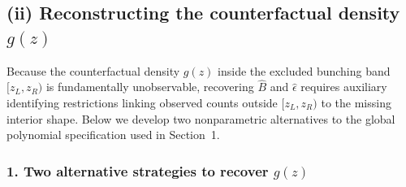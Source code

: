\subsection*{(ii) Reconstructing the counterfactual density $g(z)$}

Because the counterfactual density $g(z)$ inside the excluded bunching band $[z_L, z_R)$ is fundamentally unobservable, recovering $\hat{B}$ and $\hat{\epsilon}$ requires auxiliary identifying restrictions linking observed counts outside $[z_L, z_R)$ to the missing interior shape. Below we develop two nonparametric alternatives to the global polynomial specification used in Section~1.

\subsubsection*{1. Two alternative strategies to recover $g(z)$}

